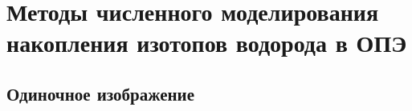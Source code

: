 \chapter{Методы численного моделирования накопления изотопов водорода в ОПЭ}\label{ch:ch2}

\section{Одиночное изображение}\label{sec:ch2/sec1}

\FloatBarrier
